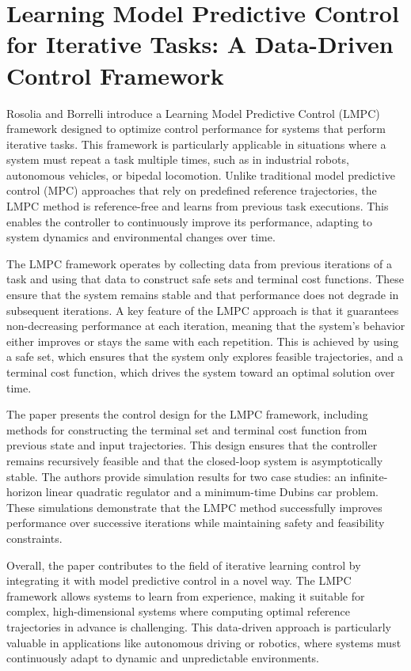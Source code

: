\documentclass[a4paper,12pt]{article}
\begin{document}
    \section{Learning Model Predictive Control for Iterative Tasks: A Data-Driven Control Framework \cite{rosolia2018learning}}
    Rosolia and Borrelli introduce a Learning Model Predictive Control (LMPC) framework designed to optimize control performance for systems that perform iterative tasks. This framework is particularly applicable in situations where a system must repeat a task multiple times, such as in industrial robots, autonomous vehicles, or bipedal locomotion. Unlike traditional model predictive control (MPC) approaches that rely on predefined reference trajectories, the LMPC method is reference-free and learns from previous task executions. This enables the controller to continuously improve its performance, adapting to system dynamics and environmental changes over time.
    
    The LMPC framework operates by collecting data from previous iterations of a task and using that data to construct safe sets and terminal cost functions. These ensure that the system remains stable and that performance does not degrade in subsequent iterations. A key feature of the LMPC approach is that it guarantees non-decreasing performance at each iteration, meaning that the system’s behavior either improves or stays the same with each repetition. This is achieved by using a safe set, which ensures that the system only explores feasible trajectories, and a terminal cost function, which drives the system toward an optimal solution over time.
    
    The paper presents the control design for the LMPC framework, including methods for constructing the terminal set and terminal cost function from previous state and input trajectories. This design ensures that the controller remains recursively feasible and that the closed-loop system is asymptotically stable. The authors provide simulation results for two case studies: an infinite-horizon linear quadratic regulator and a minimum-time Dubins car problem. These simulations demonstrate that the LMPC method successfully improves performance over successive iterations while maintaining safety and feasibility constraints.
    
    Overall, the paper contributes to the field of iterative learning control by integrating it with model predictive control in a novel way. The LMPC framework allows systems to learn from experience, making it suitable for complex, high-dimensional systems where computing optimal reference trajectories in advance is challenging. This data-driven approach is particularly valuable in applications like autonomous driving or robotics, where systems must continuously adapt to dynamic and unpredictable environments.
    

        
\end{document}
